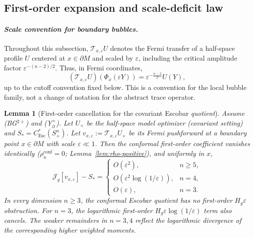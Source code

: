 \documentclass[11pt,reqno,a4paper]{amsart}
\numberwithin{equation}{section}
\theoremstyle{plain}
\newtheorem{lemma}[theorem]{Lemma}
\newcommand{\Esc}{\ensuremath{\mathrm{Esc}}}
\theoremstyle{remark}
\theoremstyle{plain}
\begin{document}
\subsection{First-order expansion and scale-deficit law}
\paragraph{\emph{Scale convention for boundary bubbles.}}
Throughout this subsection, $\mathcal T_{x,\varepsilon}U$ denotes the Fermi transfer of a half-space profile $U$ centered at
$x\in\partial M$ and scaled by $\varepsilon$, including the critical
amplitude factor $\varepsilon^{-(n-2)/2}$.  Thus, in Fermi coordinates,
\[
(\mathcal T_{x,\varepsilon}U)(\Phi_x(\varepsilon Y))
=
\varepsilon^{-\frac{n-2}{2}}U(Y),
\]
up to the cutoff convention fixed below.  This is a convention for the local
bubble family, not a change of notation for the abstract trace operator.

\begin{lemma}[First-order cancellation for the covariant Escobar \emph{quotient}]\label{lem:esc-scale-law}
Assume \textup{(BG$^{2+}$)} and \textup{(Y$^+_{\partial}$)}. Let $U_+$ be the half-space model optimizer (covariant setting) and $S_\ast = C^*_{\Esc}(S^n_+)$. Let $v_{x,\varepsilon}:=\mathcal T_{x,\varepsilon}U_+$
be its Fermi pushforward at a boundary point $x\in\partial M$ with scale $\varepsilon\ll1$.
Then the conformal first-order coefficient vanishes identically
($\rho_n^{\mathrm{conf}}=0$; Lemma~\ref{lem:rho-positive}), and uniformly in $x$,
\[
\mathcal J_g[v_{x,\varepsilon}]-S_\ast
=
\begin{cases}
O(\varepsilon^2), & n\ge5,\\[1mm]
O\!\left(\varepsilon^2\log(1/\varepsilon)\right), & n=4,\\[1mm]
O(\varepsilon), & n=3.
\end{cases}
\]
In every dimension $n\ge3$, the conformal Escobar quotient has no first-order
$H_g\varepsilon$ obstruction.  For $n=3$, the logarithmic first-order
$H_g\varepsilon\log(1/\varepsilon)$ term also cancels.
The weaker remainders in $n=3,4$ reflect the logarithmic divergence of the
corresponding higher weighted moments.
\end{lemma}
\end{document}
